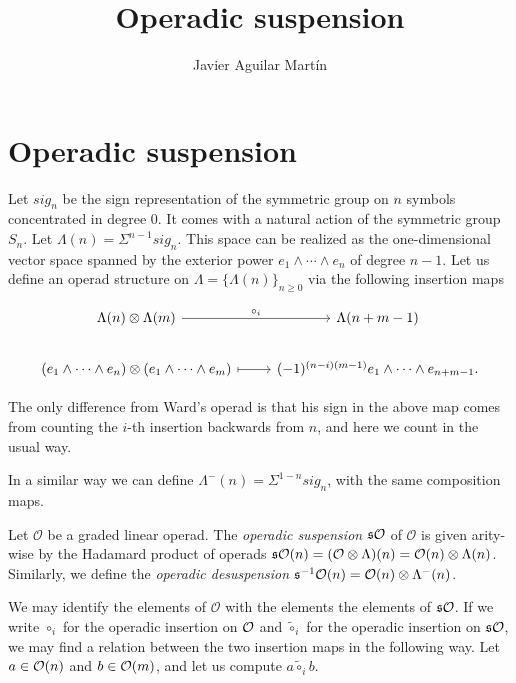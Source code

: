 \documentclass[twoside]{article}
\begin{document}
\title{Operadic suspension}
\author{Javier Aguilar Martín}
\maketitle

\section{Operadic suspension}

Let $sig_n$ be the sign representation of the symmetric group on $n$ symbols concentrated in degree 0. It comes with a natural action of the symmetric group $S_n$. Let $\Lambda(n)=\Sigma^{n-1}sig_n$. This space can be realized as the one-dimensional vector space spanned by the exterior power $e_1\land\cdots\land e_n$ of degree $n-1$. Let us define an operad structure on $\Lambda=\{\Lambda(n)\}_{n\geq 0}$ via the following insertion maps

\[
\begin{tikzcd}
\Lambda(n)\otimes\Lambda(m) \arrow[r, "\circ_i"] & \Lambda(n+m-1)\\
(e_1\land\cdots\land e_n)\otimes(e_1\land\cdots\land e_m)\arrow[r, mapsto] & (-1)^{(n-i)(m-1)}e_1\land\cdots\land e_{n+m-1}.
\end{tikzcd}
\]

The only difference from Ward's operad is that his sign in the above map comes from counting the $i$-th insertion backwards from $n$, and here we count in the usual way. 

In a similar way we can define $\Lambda^-(n)=\Sigma^{1-n}sig_n$, with the same composition maps.

\begin{definition}
Let $\mathcal{O}$ be a graded linear operad. The \emph{operadic suspension} $\mathfrak{s}{\mathcal O}$ of $\mathcal{O}$ is given arity-wise by the Hadamard product of operads $\mathfrak{s}{\mathcal O}(n)=(\mathcal{O}\otimes\Lambda)(n)=\mathcal{O}(n)\otimes\Lambda(n)$. Similarly, we define the \emph{operadic desuspension} $\mathfrak{s}^{-1}{\mathcal O}(n)=\mathcal{O}(n)\otimes\Lambda^-(n)$.
\end{definition}


We may identify the elements of $\mathcal{O}$ with the elements the elements of $\mathfrak{s}{\mathcal O}$. If we write $\circ_i$ for the operadic insertion on ${\mathcal O}$ and $\tilde{\circ}_i$ for the operadic insertion on $\mathfrak{s}{\mathcal O}$, we may find a relation between the two insertion maps in the following way. Let $a\in{\mathcal O}(n)$ and $b\in{\mathcal O}(m)$, and let us compute $a\tilde{\circ}_i b$.
\end{document}
